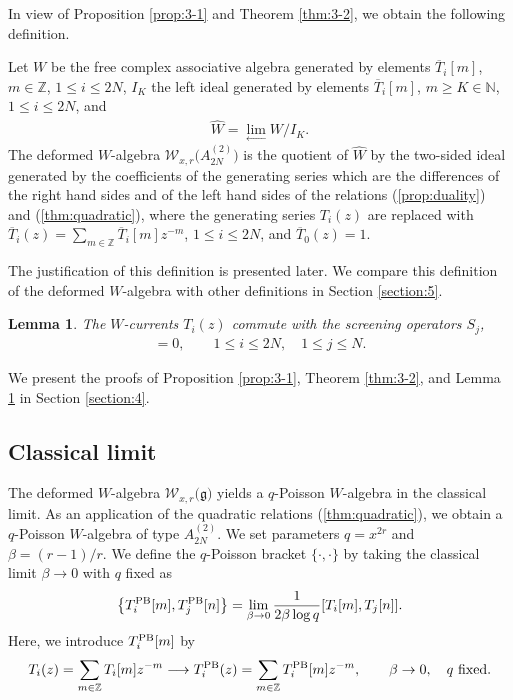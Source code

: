 \documentclass[pdftex]{sigma}
\numberwithin{equation}{section}
\newtheorem{Lemma}[Theorem]{Lemma}
\begin{document}
In view of Proposition \ref{prop:3-1}	
and Theorem \ref{thm:3-2}, we obtain the following definition.

\begin{Definition}
\label{def:3-3}
Let $W$ be the free complex associative algebra generated by elements
$\overline{T}_i[m]$, $m\in \mathbb{Z}$, $1\leq i \leq 2N$, $I_K$ the left
ideal generated by elements $\overline{T}_i[m]$, $m \geq K \in \mathbb{N}$,
$1\leq i \leq 2N$, and
\begin{gather*}
\widehat{W}=\lim_{\leftarrow}W/I_K.
\end{gather*}
The deformed $W$-algebra
${\mathcal W}_{x,r}\bigl(A_{2N}^{(2)}\bigr)$
is the quotient of $\widehat{W}$ by the two-sided ideal generated by
the coefficients of the generating series which are the differences
of the right hand sides and of the left hand sides
of the relations (\ref{prop:duality}) and (\ref{thm:quadratic}),
where the generating series $T_i(z)$
are replaced with
$\overline{T}_i(z)=\sum_{m \in \mathbb{Z}}\overline{T}_i[m]z^{-m}$, $1\leq i \leq 2N$,
and $\overline{T}_0(z)=1$.
\end{Definition}

The justification of this definition is presented later. We compare
this definition of the deformed $W$-algebra with other definitions in Section \ref{section:5}.
\begin{Lemma}\label{lem:3-4}
The $W$-currents $T_i(z)$ commute with the screening operators $S_j$,
\begin{gather}
[T_i(z), S_j]=0,\qquad
1 \leq i \leq 2N,\quad 1\leq j \leq N.
\label{eqn:screening}
\end{gather}
\end{Lemma}
We present the proofs of Proposition \ref{prop:3-1},
Theorem \ref{thm:3-2}, and Lemma \ref{lem:3-4}
in Section \ref{section:4}.

\subsection{Classical limit}

The deformed $W$-algebra
${\mathcal W}_{x, r}\bigl({\mathfrak g}\bigr)$
yields a $q$-Poisson $W$-algebra
\cite{Frenkel-Reshetikhin2,Frenkel-Reshetikhin1,Frenkel-Reshetikhin-Semenov,Semenov-Sevostyanov}
in the classical limit.
As an application of the quadratic relations (\ref{thm:quadratic}),
we obtain a $q$-Poisson $W$-algebra of type $A_{2N}^{(2)}$.
We set parameters $q=x^{2r}$ and $\beta=(r-1)/r$.
We define the $q$-Poisson bracket $\{\cdot, \cdot\}$
by taking the classical limit $\beta \to 0$ with $q$ fixed as
\begin{gather*}
\bigl\{T_i^{{\rm PB}}[m], T_j^{{\rm PB}}[n]\bigr\}
=\lim_{\beta \to 0}\frac{1}{2 \beta \log q}[T_i[m],T_j[n]].
\end{gather*}
Here, we introduce $T_i^{\rm PB}[m]$ by
\[
T_i(z)=\sum_{m \in \mathbb{Z}}T_i[m]z^{-m} \longrightarrow T_i^{\rm PB}(z)=\sum_{m \in \mathbb{Z}}T_i^{\rm PB}[m]z^{-m},\qquad
\beta \to 0,\quad
q~\text{fixed}.
\]
\end{document}
